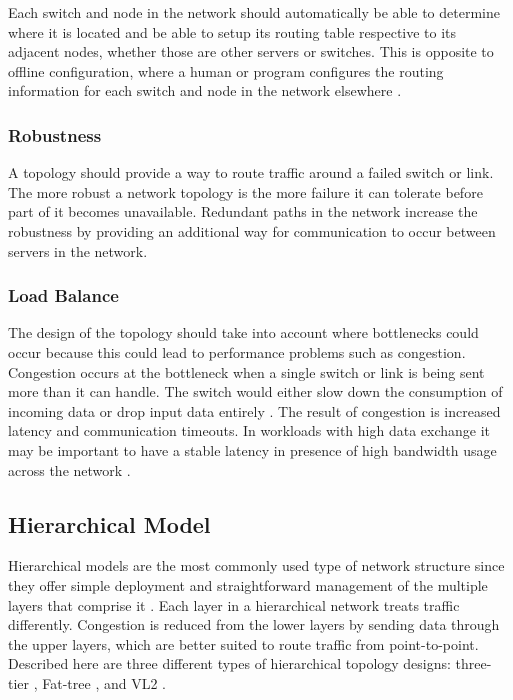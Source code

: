 \documentclass[12pt]{article}
\begin{document}
Each switch and node in the network should automatically be able to determine where it is located and be able to setup its routing table respective to its adjacent nodes, whether those are other servers or switches. This is opposite to offline configuration, where a human or program configures the routing information for each switch and node in the network elsewhere \cite{wang2015survey}.


\subsubsection{Robustness} \label{ssub:net-robustness}

A topology should provide a way to route traffic around a failed switch or link. The more robust a network topology is the more failure it can tolerate before part of it becomes unavailable. Redundant paths in the network increase the robustness by providing an additional way for communication to occur between servers in the network.


\subsubsection{Load Balance} \label{ssub:net-load-balance}

The design of the topology should take into account where bottlenecks could occur because this could lead to performance problems such as congestion. Congestion occurs at the bottleneck when a single switch or link is being sent more than it can handle. The switch would either slow down the consumption of incoming data or drop input data entirely \cite{xia2016survey}. The result of congestion is increased latency and communication timeouts. In workloads with high data exchange it may be important to have a stable latency in presence of high bandwidth usage across the network .





\subsection{Hierarchical Model} \label{sub:net-hierarchical}

Hierarchical models are the most commonly used type of network structure since they offer simple deployment and straightforward management of the multiple layers that comprise it \cite{wang2015survey, xia2016survey}. Each layer in a hierarchical network treats traffic differently. Congestion is reduced from the lower layers by sending data through the upper layers, which are better suited to route traffic from point-to-point. Described here are three different types of hierarchical topology designs: three-tier \cite{kliazovich2012greencloud}, Fat-tree \cite{al2008scalable}, and VL2 \cite{greenberg2009vl2}.
\end{document}
